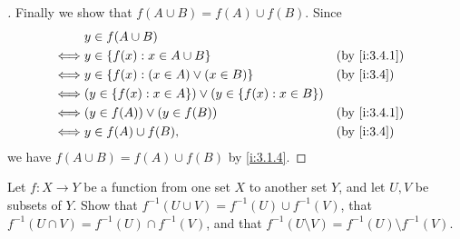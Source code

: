 \begin{proof}[]
  Finally we show that \(f(A \cup B) = f(A) \cup f(B)\).
  Since
  \begin{align*}
         & y \in f(A \cup B)                                                                      \\
    \iff & y \in \set{f(x) : x \in A \cup B}                                    &  & \by{i:3.4.1} \\
    \iff & y \in \set{f(x) : (x \in A) \lor (x \in B)}                          &  & \by{i:3.4}   \\
    \iff & \pa{y \in \set{f(x) : x \in A}} \lor \pa{y \in \set{f(x) : x \in B}}                   \\
    \iff & (y \in f(A)) \lor (y \in f(B))                                       &  & \by{i:3.4.1} \\
    \iff & y \in f(A) \cup f(B),                                                &  & \by{i:3.4}
  \end{align*}
  we have \(f(A \cup B) = f(A) \cup f(B)\) by \cref{i:3.1.4}.
\end{proof}

\begin{ex}\label{i:ex:3.4.4}
  Let \(f : X \to Y\) be a function from one set \(X\) to another set \(Y\), and let \(U, V\) be subsets of \(Y\).
  Show that \(f^{-1}(U \cup V) = f^{-1}(U) \cup f^{-1}(V)\), that \(f^{-1}(U \cap V) = f^{-1}(U) \cap f^{-1}(V)\), and that \(f^{-1}(U \setminus V) = f^{-1}(U) \setminus f^{-1}(V)\).
\end{ex}

